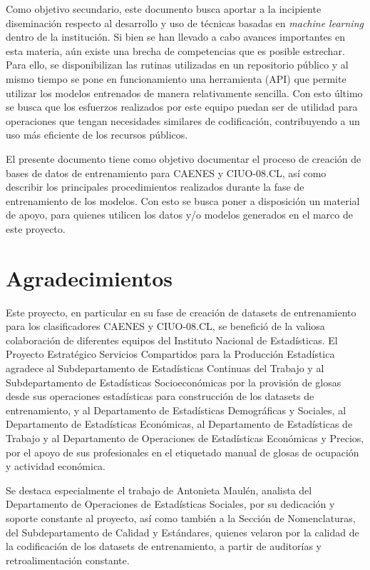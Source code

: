 \documentclass[
  12pt,
  spanish,
]{article}
\begin{document}
Como objetivo secundario, este documento busca aportar a la incipiente
diseminación respecto al desarrollo y uso de técnicas basadas en
\emph{machine learning} dentro de la institución. Si bien se han llevado
a cabo avances importantes en esta materia, aún existe una brecha de
competencias que es posible estrechar. Para ello, se disponibilizan las
rutinas utilizadas en un repositorio público y al mismo tiempo se pone
en funcionamiento una herramienta (API) que permite utilizar los modelos
entrenados de manera relativamente sencilla. Con esto último se busca
que los esfuerzos realizados por este equipo puedan ser de utilidad para
operaciones que tengan necesidades similares de codificación,
contribuyendo a un uso más eficiente de los recursos públicos.

El presente documento tiene como objetivo documentar el proceso de
creación de bases de datos de entrenamiento para CAENES y CIUO-08.CL,
así como describir los principales procedimientos realizados durante la
fase de entrenamiento de los modelos. Con esto se busca poner a
disposición un material de apoyo, para quienes utilicen los datos y/o
modelos generados en el marco de este proyecto.

\newpage

\hypertarget{agradecimientos}{%
\section{Agradecimientos}\label{agradecimientos}}

Este proyecto, en particular en su fase de creación de datasets de
entrenamiento para los clasificadores CAENES y CIUO-08.CL, se benefició
de la valiosa colaboración de diferentes equipos del Instituto Nacional
de Estadísticas. El Proyecto Estratégico Servicios Compartidos para la
Producción Estadística agradece al Subdepartamento de Estadísticas
Continuas del Trabajo y al Subdepartamento de Estadísticas
Socioeconómicas por la provisión de glosas desde sus operaciones
estadísticas para construcción de los datasets de entrenamiento, y al
Departamento de Estadísticas Demográficas y Sociales, al Departamento de
Estadísticas Económicas, al Departamento de Estadísticas de Trabajo y al
Departamento de Operaciones de Estadísticas Económicas y Precios, por el
apoyo de sus profesionales en el etiquetado manual de glosas de
ocupación y actividad económica.

Se destaca especialmente el trabajo de Antonieta Maulén, analista del
Departamento de Operaciones de Estadísticas Sociales, por su dedicación
y soporte constante al proyecto, así como también a la Sección de
Nomenclaturas, del Subdepartamento de Calidad y Estándares, quienes
velaron por la calidad de la codificación de los datasets de
entrenamiento, a partir de auditorías y retroalimentación constante.
\end{document}
